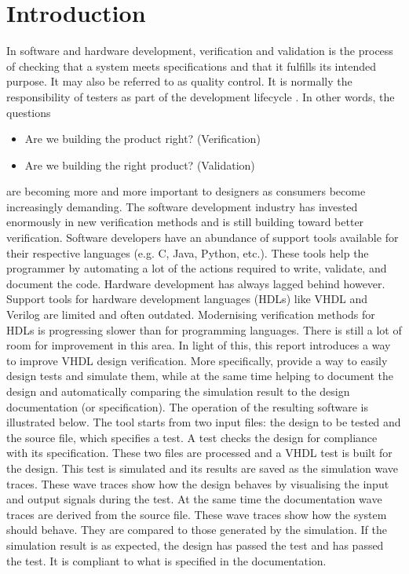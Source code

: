 \chapter{Introduction}
In software and hardware development, verification and validation is the process of checking that a system meets specifications and that it fulfills its intended purpose. It may also be referred to as quality control. It is normally the responsibility of testers as part of the development lifecycle \cite{intro:wiki}.\nline
In other words, the questions
\begin{itemize}
	\item Are we building the product right? (Verification)
	\item Are we building the right product? (Validation)
\end{itemize}
are becoming more and more important to designers as consumers become increasingly demanding.
\npar
The software development industry has invested enormously in new verification methods and is still building toward better verification. Software developers have an abundance of support tools available for their respective languages (e.g. C, Java, Python, etc.). These tools help the programmer by automating a lot of the actions required to write, validate, and document the code.
\npar
Hardware development has always lagged behind however. Support tools for hardware development languages (HDLs) like VHDL and Verilog are limited and often outdated. Modernising verification methods for HDLs is progressing slower than for programming languages. There is still a lot of room for improvement in this area.
\npar
In light of this, this report introduces a way to improve VHDL design verification. More specifically, provide a way to easily design tests and simulate them, while at the same time helping to document the design and automatically comparing the simulation result to the design documentation (or specification). The operation of the resulting software is illustrated below.%
\nline
The tool starts from two input files: the design to be tested and the source file, which specifies a test. A test checks the design for compliance with its specification. These two files are processed and a VHDL test is built for the design. This test is simulated and its results are saved as the simulation wave traces. These wave traces show how the design behaves by visualising the input and output signals during the test. At the same time the documentation wave traces are derived from the source file. These wave traces show how the system should behave. They are compared to those generated by the simulation. If the simulation result is as expected, the design has passed the test and has passed the test. It is compliant to what is specified in the documentation. 
